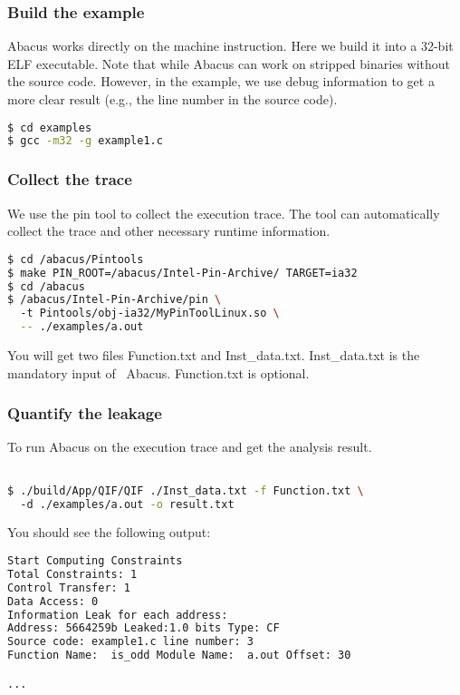 \documentclass[10pt,conference]{IEEEtran}
\newcommand{\tool}{\textsf{Abacus}}
\begin{document}
\subsubsection{Build the example}

Abacus works directly on the machine instruction. Here we build it into 
a 32-bit ELF executable. Note that while Abacus can work on stripped binaries 
without the source code. However, in the example, we use debug information 
to get a more clear result (e.g., the line number in the source code).
\begin{lstlisting}[language=bash]
$ cd examples
$ gcc -m32 -g example1.c
\end{lstlisting}


\subsubsection{Collect the trace}
We use the pin tool to collect the execution trace. The tool can automatically 
collect the trace and other necessary runtime information.
\begin{lstlisting}[language=bash]
$ cd /abacus/Pintools
$ make PIN_ROOT=/abacus/Intel-Pin-Archive/ TARGET=ia32
$ cd /abacus
$ /abacus/Intel-Pin-Archive/pin \ 
  -t Pintools/obj-ia32/MyPinToolLinux.so \
  -- ./examples/a.out 
\end{lstlisting}

You will get two files \textsf{Function.txt} and \textsf{Inst\_data.txt}. \textsf{Inst\_data.txt} is the mandatory input of ~\tool{}. \textsf{Function.txt}
is optional. 

\subsubsection{Quantify the leakage}
To run Abacus on the execution trace and get the analysis result.
\begin{lstlisting}[language=bash]

$ ./build/App/QIF/QIF ./Inst_data.txt -f Function.txt \ 
  -d ./examples/a.out -o result.txt
\end{lstlisting}

You should see the following output:

\begin{lstlisting}[language=bash]
Start Computing Constraints
Total Constraints: 1
Control Transfer: 1
Data Access: 0
Information Leak for each address:
Address: 5664259b Leaked:1.0 bits Type: CF  
Source code: example1.c line number: 3
Function Name:  is_odd Module Name:  a.out Offset: 30

...
\end{lstlisting}
\end{document}
